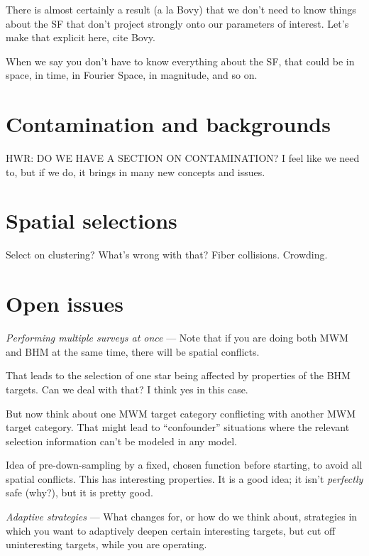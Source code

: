 \documentclass[modern]{aastex62}
\renewcommand{\paragraph}[1]{\medskip\noindent\textit{#1} ---}
\begin{document}
There is almost certainly a result (a la Bovy) that we don't need to know
things about the SF that don't project strongly onto our parameters of interest.
Let's make that explicit here, cite Bovy.

When we say you don't have to know everything about the SF, that could be
in space, in time, in Fourier Space, in magnitude, and so on.

\section{Contamination and backgrounds}\label{sec:bg}

HWR: DO WE HAVE A SECTION ON CONTAMINATION? I feel like we need to,
but if we do, it brings in many new concepts and issues.

\section{Spatial selections}

Select on clustering? What's wrong with that? Fiber collisions. Crowding.

\section{Open issues}

\paragraph{Performing multiple surveys at once}
Note that if you are doing both MWM and BHM at the same time, there will be
spatial conflicts.

That leads to the selection of one star being affected by properties of the
BHM targets. Can we deal with that? I think yes in this case.

But now think about one MWM target category conflicting with another MWM target
category. That might lead to ``confounder'' situations where the relevant selection
information can't be modeled in any model.

Idea of pre-down-sampling by a fixed, chosen function before starting, to avoid
all spatial conflicts. This has interesting properties. It is a good idea; it isn't
\emph{perfectly} safe (why?), but it is pretty good.

\paragraph{Adaptive strategies}
What changes for, or how do we think about, strategies in which you want to
adaptively deepen certain interesting targets, but cut off uninteresting targets,
while you are operating.
\end{document}
